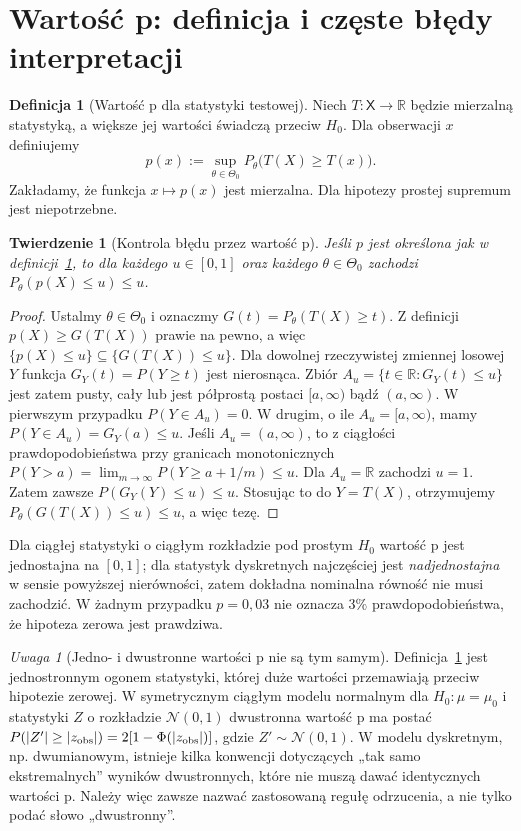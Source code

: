 \documentclass[11pt,a4paper,oneside]{report}
\numberwithin{equation}{chapter}
\theoremstyle{plain}
\newtheorem{twierdzenie}{Twierdzenie}[chapter]
\theoremstyle{definition}
\newtheorem{definicja}{Definicja}[chapter]
\theoremstyle{remark}
\newtheorem{uwaga}{Uwaga}[chapter]
\newcommand{\R}{\mathbb R}
\newcommand{\Normal}{\mathcal N}
\begin{document}
\section{Wartość p: definicja i częste błędy interpretacji}
\begin{definicja}[Wartość p dla statystyki testowej]\label{def:pvalue}
Niech $T:\mathsf X\to\R$ będzie mierzalną statystyką,
a większe jej wartości świadczą przeciw $H_0$.
Dla obserwacji $x$ definiujemy
\[
 p(x):=\sup_{\theta\in\Theta_0}
 P_\theta\bigl(T(X)\ge T(x)\bigr).
\]
Zakładamy, że funkcja $x\mapsto p(x)$ jest mierzalna.
Dla hipotezy prostej supremum jest niepotrzebne.
\end{definicja}

\begin{twierdzenie}[Kontrola błędu przez wartość p]
\label{thm:pvalue-valid}
Jeśli $p$ jest określona jak w definicji~\ref{def:pvalue},
to dla każdego $u\in[0,1]$ oraz każdego $\theta\in\Theta_0$
zachodzi $P_\theta(p(X)\le u)\le u$.
\end{twierdzenie}
\begin{proof}
Ustalmy $\theta\in\Theta_0$ i oznaczmy
$G(t)=P_\theta(T(X)\ge t)$.
Z definicji $p(X)\ge G(T(X))$ prawie na pewno, a więc
$\{p(X)\le u\}\subseteq\{G(T(X))\le u\}$.
Dla dowolnej rzeczywistej zmiennej losowej $Y$ funkcja
$G_Y(t)=P(Y\ge t)$ jest nierosnąca. Zbiór
$A_u=\{t\in\R:G_Y(t)\le u\}$ jest zatem pusty,
cały lub jest półprostą postaci $[a,\infty)$ bądź
$(a,\infty)$. W pierwszym przypadku
$P(Y\in A_u)=0$. W drugim, o ile $A_u=[a,\infty)$,
mamy $P(Y\in A_u)=G_Y(a)\le u$.
Jeśli $A_u=(a,\infty)$, to z ciągłości prawdopodobieństwa
przy granicach monotonicznych
$P(Y>a)=\lim_{m\to\infty}P(Y\ge a+1/m)\le u$.
Dla $A_u=\R$ zachodzi $u=1$.
Zatem zawsze $P(G_Y(Y)\le u)\le u$. Stosując to do
$Y=T(X)$, otrzymujemy
$P_\theta(G(T(X))\le u)\le u$, a więc tezę.
\end{proof}

Dla ciągłej statystyki o ciągłym rozkładzie pod prostym
$H_0$ wartość p jest jednostajna na $[0,1]$; dla statystyk
dyskretnych najczęściej jest \emph{nadjednostajna} w sensie
powyższej nierówności, zatem dokładna nominalna równość nie
musi zachodzić. W żadnym przypadku $p=0{,}03$ nie oznacza
$3\%$ prawdopodobieństwa, że hipoteza zerowa jest prawdziwa.

\begin{uwaga}[Jedno- i dwustronne wartości p nie są tym samym]
Definicja~\ref{def:pvalue} jest jednostronnym ogonem statystyki,
której duże wartości przemawiają przeciw hipotezie zerowej.
W symetrycznym ciągłym modelu normalnym dla
$H_0:\mu=\mu_0$ i statystyki $Z$ o rozkładzie
$\Normal(0,1)$ dwustronna wartość p ma postać
$P(|Z'|\ge|z_{\rm obs}|)=2[1-\Phi(|z_{\rm obs}|)]$,
gdzie $Z'\sim\Normal(0,1)$. W modelu dyskretnym,
np. dwumianowym, istnieje kilka konwencji dotyczących
„tak samo ekstremalnych” wyników dwustronnych, które
nie muszą dawać identycznych wartości p. Należy więc
zawsze nazwać zastosowaną regułę odrzucenia, a nie tylko
podać słowo „dwustronny”.
\end{uwaga}
\end{document}
